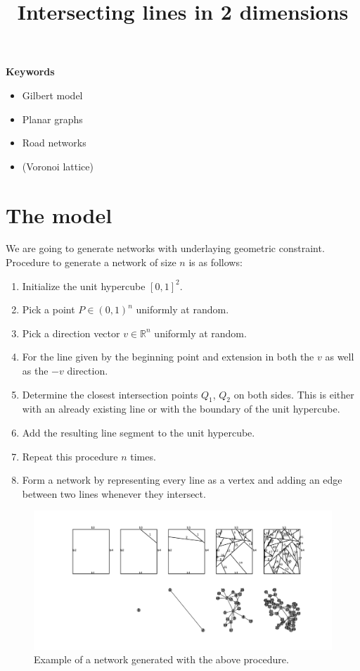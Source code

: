 \documentclass{article}
\title{Intersecting lines in 2 dimensions}
\theoremstyle{definition}
\theoremstyle{remark}
\begin{document}
\maketitle

{\bf Keywords}
\begin{itemize}
    \item Gilbert model
    \item Planar graphs
    \item Road networks
    \item (Voronoi lattice)
\end{itemize}

\section{The model}
We are going to generate networks with underlaying geometric constraint. Procedure to generate a network of size $n$ is as follows:
\begin{enumerate}
    \item Initialize the unit hypercube $[0,1]^2$.
    \item Pick a point $P\in (0,1)^n$ uniformly at random.
    \item Pick a direction vector $v\in \mathbb{R}^n$ uniformly at random.
    \item For the line given by the beginning point and extension in both the $v$ as well as the $-v$ direction.
    \item Determine the closest intersection points $Q_1$, $Q_2$ on both sides. This is either with an already existing line or with the boundary of the unit hypercube.
    \item Add the resulting line segment to the unit hypercube.
    \item Repeat this procedure $n$ times.
    \item Form a network by representing every line as a vertex and adding an edge between two lines whenever they intersect.
\end{enumerate}

\begin{figure}
    \centering
    \includegraphics[width=\linewidth]{Figures/NetworkEvolution.pdf}
    \caption{Example of a network generated with the above procedure.}
    \label{fig:Example}
\end{figure}
\end{document}
